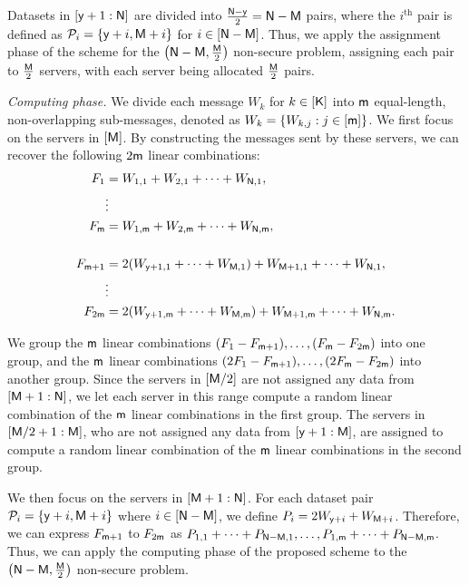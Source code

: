 \documentclass[conference,letterpaper]{IEEEtran}
\begin{document}
Datasets in $[{\sf y}+1 : {\sf N}]$ are divided into $\frac{{\sf N}-{\sf y}}{2} = {\sf N}-{\sf M}$ pairs, where the $i^{\text{th}}$ pair is defined as ${\cal P}_i = \{{\sf y}+i, {\sf M}+i\}$ for $i \in [{\sf N}-{\sf M}]$. Thus, we apply the assignment phase of the scheme for the $\left({\sf N}-{\sf M}, \frac{{\sf M}}{2}\right)$ non-secure problem, assigning each pair to $\frac{{\sf M}}{2}$ servers, with each server being allocated $\frac{{\sf M}}{2}$ pairs.

{\it Computing phase.}
We divide each message $W_k$ for $k \in [{\sf K}]$ into ${\sf m}$ equal-length, non-overlapping sub-messages, denoted as $W_k = \{W_{k,j} : j \in [{\sf m}]\}$.
We first focus on the servers in $[{\sf M}]$. By constructing the messages sent by these servers, we can recover the following $2{\sf m}$ linear combinations:
\begin{align*}
    F_1 &= W_{1,1} + W_{2,1} + \cdots + W_{{\sf N},1}, \\
    &\vdots \\
    F_{{\sf m}} &= W_{1,{\sf m}} + W_{2,{\sf m}} + \cdots + W_{{\sf N},{\sf m}}, \\
    \\
    F_{{\sf m}+1} &= 2(W_{{\sf y}+1,1} + \cdots + W_{{\sf M},1}) + W_{{\sf M}+1,1} + \cdots + W_{{\sf N},1}, \\
    &\vdots \\
    F_{2{\sf m}} &= 2(W_{{\sf y}+1,{\sf m}} + \cdots + W_{{\sf M},{\sf m}}) + W_{{\sf M}+1,{\sf m}} + \cdots + W_{{\sf N},{\sf m}}.
\end{align*}

We group the ${\sf m}$ linear combinations $(F_1 - F_{{\sf m}+1}), \ldots, (F_{{\sf m}} - F_{2{\sf m}})$ into one group, and the ${\sf m}$ linear combinations $(2F_1 - F_{{\sf m}+1}), \ldots, (2F_{{\sf m}} - F_{2{\sf m}})$ into another group. Since the servers in $[{\sf M}/2]$ are not assigned any data from $[{\sf M}+1: {\sf N}]$, we let each server in this range compute a random linear combination of the ${\sf m}$ linear combinations in the first group. The servers in $[{\sf M}/2+1: {\sf M}]$, who are not assigned any data from $[{\sf y}+1: {\sf M}]$, are assigned to compute a random linear combination of the ${\sf m}$ linear combinations in the second group.

We then focus on the servers in $[{\sf M}+1: {\sf N}]$. For each dataset pair ${\cal P}_i = \{{\sf y}+i, {\sf M}+i\}$ where $i \in [{\sf N} - {\sf M}]$, we define $P_i = 2W_{{\sf y}+i} + W_{{\sf M}+i}$. Therefore, we can express $F_{{\sf m}+1}$ to $F_{2{\sf m}}$ as $P_{1,1} + \cdots + P_{{\sf N}-{\sf M},1}, \ldots, P_{1,{\sf m}} + \cdots + P_{{\sf N}-{\sf M},{\sf m}}$.
Thus, we can apply the computing phase of the proposed scheme to the $\left({\sf N} - {\sf M}, \frac{{\sf M}}{2}\right)$ non-secure problem.
\\
\end{document}
